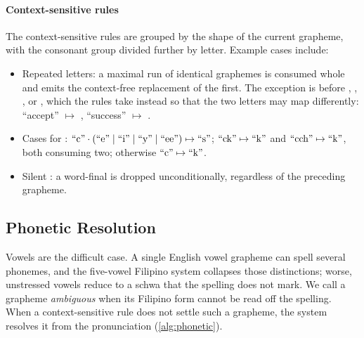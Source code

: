 \paragraph{Context-sensitive rules}
The context-sensitive rules are grouped by the shape of the current grapheme,
with the consonant group divided further by letter. Example cases include:
\begin{itemize}
      \item Repeated letters: a maximal run of identical graphemes is consumed whole and
            emits the context-free replacement of the first. The exception is 
            before , , , or , which the  rules take instead
            so that the two letters may map differently: ``accept'' $\mapsto$ ,
            ``success'' $\mapsto$ .
      \item Cases for : \(\gr{c}\cdot(\gr{e}\mid\gr{i}\mid\gr{y}\mid\gr{ee})
            \mapsto\gr{s}\); \(\gr{ck}\mapsto\gr{k}\) and \(\gr{cch}\mapsto\gr{k}\), both
            consuming two; otherwise \(\gr{c}\mapsto\gr{k}\).
      \item Silent : a word-final  is dropped unconditionally, regardless of
            the preceding grapheme.
\end{itemize}

\subsection{Phonetic Resolution}\label{subsec:phonetic_resolution}

Vowels are the difficult case. A single English vowel grapheme can spell
several phonemes, and the five-vowel Filipino system collapses those
distinctions; worse, unstressed vowels reduce to a schwa that the spelling does
not mark. We call a grapheme \emph{ambiguous} when its Filipino form cannot be
read off the spelling. When a context-sensitive rule does not settle such a
grapheme, the system resolves it from the pronunciation (\cref{alg:phonetic}).

